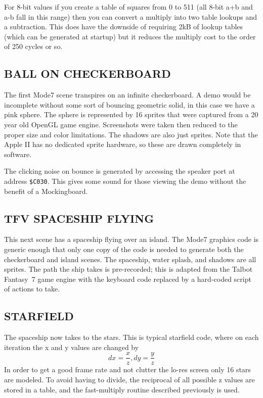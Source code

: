 \documentclass[twocolumn]{article}
\begin{document}
For 8-bit values if you create a table of squares from 0 to 511
(all 8-bit a+b and a-b fall in this range) then you can convert a multiply
into two table lookups and a subtraction.
This does have the downside of requiring 2kB of lookup tables
(which can be generated at startup) but it reduces the multiply
cost to the order of 250 cycles or so.


\subsection{BALL ON CHECKERBOARD}

The first Mode7 scene transpires on an infinite checkerboard.
A demo would be incomplete without some sort of bouncing geometric solid,
in this case we have a pink sphere.
The sphere is represented by 16 sprites that were captured from
a 20 year old OpenGL game engine.
Screenshots were taken then reduced to the proper size and color
limitations.
The shadows are also just sprites.
Note that the Apple II has no dedicated sprite hardware, so these
are drawn completely in software.

The clicking noise on bounce is generated by accessing the speaker port
at address {\tt \$C030}.
This gives some sound for those viewing the demo without the benefit
of a Mockingboard.

\subsection{TFV SPACESHIP FLYING}

This next scene has a spaceship flying over an island.
The Mode7 graphics code is generic enough that only one copy of the code
is needed to generate both the checkerboard and island scenes.
The spaceship, water splash, and shadows are all sprites.
The path the ship takes is pre-recorded; this is adapted from the
Talbot Fantasy~7 game engine with the keyboard code replaced by a hard-coded
script of actions to take.

\subsection{STARFIELD}

The spaceship now takes to the stars.
This is typical starfield code, where on each iteration the x and y
values are changed by
	\[dx=\frac{x}{z}, dy=\frac{y}{z}\]
In order to get a good frame rate and not clutter the lo-res screen
only 16 stars are modeled.
To avoid having to divide, the reciprocal of all possible z values
are stored in a table, and the fast-multiply routine described
previously is used.
\end{document}
